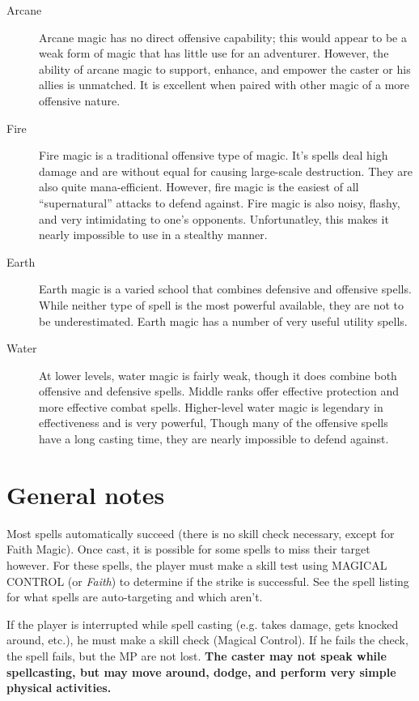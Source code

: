 \begin{description}
\item[Arcane] Arcane magic has no direct offensive capability; this
  would appear to be a weak form of magic that has little use for an
  adventurer.  However, the ability of arcane magic to support,
  enhance, and empower the caster or his allies is unmatched.  It is
  excellent when paired with other magic of a more offensive nature.

\item[Fire] Fire magic is a traditional offensive type of magic.  It's
  spells deal high damage and are without equal for causing
  large-scale destruction.  They are also quite mana-efficient.
  However, fire magic is the easiest of all ``supernatural'' attacks
  to defend against.  Fire magic is also noisy, flashy, and very
  intimidating to one's opponents.  Unfortunatley, this makes it
  nearly impossible to use in a stealthy manner.

\item[Earth] Earth magic is a varied school that combines defensive
  and offensive spells.  While neither type of spell is the most
  powerful available, they are not to be underestimated.  Earth magic
  has a number of very useful utility spells.

\item[Water] At lower levels, water magic is fairly weak, though it
  does combine both offensive and defensive spells.  Middle ranks
  offer effective protection and more effective combat spells.
  Higher-level water magic is legendary in effectiveness and is very
  powerful, Though many of the offensive spells have a long casting
  time, they are nearly impossible to defend against.
\end{description}

\section{General notes}

Most spells automatically succeed (there is no skill check necessary,
except for Faith Magic).  Once cast, it is possible for some spells to
miss their target however.  For these spells, the player must make a
skill test using MAGICAL CONTROL (or \emph{Faith}) to determine if the
strike is successful.  See the spell listing for what spells are
auto-targeting and which aren't.

If the player is interrupted while spell casting (e.g. takes damage,
gets knocked around, etc.), he must make a skill check (Magical
Control).  If he fails the check, the spell fails, but the MP are not
lost.  \textbf{The caster may not speak while spellcasting, but may
  move around, dodge, and perform very simple physical activities.}

